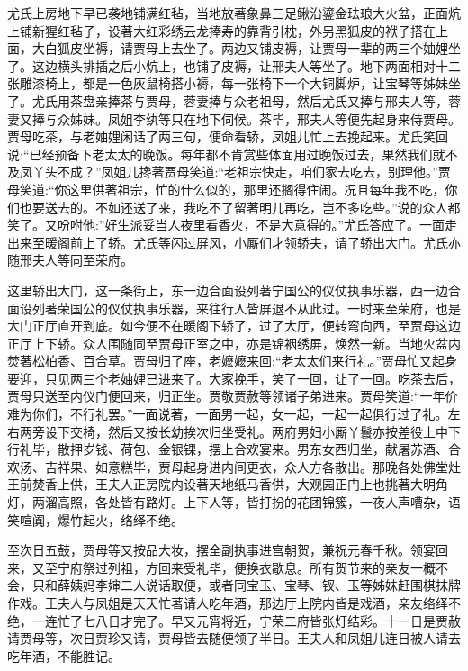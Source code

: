 \begin{parag}
    尤氏上房地下早已袭地铺满红毡，当地放著象鼻三足鳅沿鎏金珐琅大火盆，正面炕上铺新猩红毡子，设著大红彩绣云龙捧寿的靠背引枕，外另黑狐皮的袱子搭在上面，大白狐皮坐褥，请贾母上去坐了。两边又铺皮褥，让贾母一辈的两三个妯娌坐了。这边横头排插之后小炕上，也铺了皮褥，让邢夫人等坐了。地下两面相对十二张雕漆椅上，都是一色灰鼠椅搭小褥，每一张椅下一个大铜脚炉，让宝琴等姊妹坐了。尤氏用茶盘亲捧茶与贾母，蓉妻捧与众老祖母，然后尤氏又捧与邢夫人等，蓉妻又捧与众姊妹。凤姐李纨等只在地下伺候。茶毕，邢夫人等便先起身来侍贾母。贾母吃茶，与老妯娌闲话了两三句，便命看轿，凤姐儿忙上去挽起来。尤氏笑回说:“已经预备下老太太的晚饭。每年都不肯赏些体面用过晚饭过去，果然我们就不及凤丫头不成？”凤姐儿搀著贾母笑道:“老祖宗快走，咱们家去吃去，别理他。”贾母笑道:“你这里供著祖宗，忙的什么似的，那里还搁得住闹。况且每年我不吃，你们也要送去的。不如还送了来，我吃不了留著明儿再吃，岂不多吃些。”说的众人都笑了。又吩咐他:”好生派妥当人夜里看香火，不是大意得的。”尤氏答应了。一面走出来至暖阁前上了轿。尤氏等闪过屏风，小厮们才领轿夫，请了轿出大门。尤氏亦随邢夫人等同至荣府。
\end{parag}


\begin{parag}
    这里轿出大门，这一条街上，东一边合面设列著宁国公的仪仗执事乐器，西一边合面设列著荣国公的仪仗执事乐器，来往行人皆屏退不从此过。一时来至荣府，也是大门正厅直开到底。如今便不在暖阁下轿了，过了大厅，便转弯向西，至贾母这边正厅上下轿。众人围随同至贾母正室之中，亦是锦裀绣屏，焕然一新。当地火盆内焚著松柏香、百合草。贾母归了座，老嬷嬷来回:“老太太们来行礼。”贾母忙又起身要迎，只见两三个老妯娌已进来了。大家挽手，笑了一回，让了一回。吃茶去后，贾母只送至内仪门便回来，归正坐。贾敬贾赦等领诸子弟进来。贾母笑道:“一年价难为你们，不行礼罢。”一面说著，一面男一起，女一起，一起一起俱行过了礼。左右两旁设下交椅，然后又按长幼挨次归坐受礼。两府男妇小厮丫鬟亦按差役上中下行礼毕，散押岁钱、荷包、金银锞，摆上合欢宴来。男东女西归坐，献屠苏酒、合欢汤、吉祥果、如意糕毕，贾母起身进内间更衣，众人方各散出。那晚各处佛堂灶王前焚香上供，王夫人正房院内设著天地纸马香供，大观园正门上也挑著大明角灯，两溜高照，各处皆有路灯。上下人等，皆打扮的花团锦簇，一夜人声嘈杂，语笑喧阗，爆竹起火，络绎不绝。
\end{parag}


\begin{parag}
    至次日五鼓，贾母等又按品大妆，摆全副执事进宫朝贺，兼祝元春千秋。领宴回来，又至宁府祭过列祖，方回来受礼毕，便换衣歇息。所有贺节来的亲友一概不会，只和薛姨妈李婶二人说话取便，或者同宝玉、宝琴、钗、玉等姊妹赶围棋抹牌作戏。王夫人与凤姐是天天忙著请人吃年酒，那边厅上院内皆是戏酒，亲友络绎不绝，一连忙了七八日才完了。早又元宵将近，宁荣二府皆张灯结彩。十一日是贾赦请贾母等，次日贾珍又请，贾母皆去随便领了半日。王夫人和凤姐儿连日被人请去吃年酒，不能胜记。
\end{parag}


